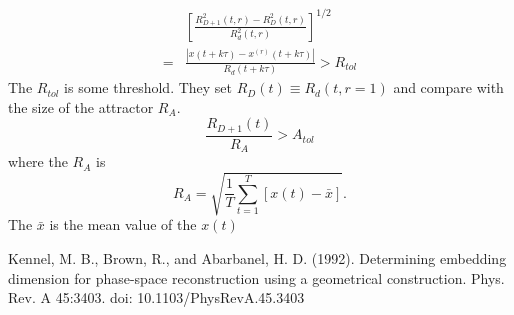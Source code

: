 \documentclass[conference]{IEEEtran}
\begin{document}
 \begin{equation}
     \begin{aligned}
      &\left[\frac{R_{D+1}^2(t,r) -R_{D}^2(t,r)}{R_d^2(t,r)}\right]^{1/2}\\
      =&\frac{\left|x(t+k\tau)-x^{(r)}(t+k\tau)\right|}{R_d(t+k\tau)}>R_{tol}
     \end{aligned}
 \end{equation}
 The $R_{tol}$ is some threshold. They set $R_D(t)\equiv R_d(t, r=1)$ and compare with the size of the attractor $R_A$.
 \begin{equation}
     \frac{R_{D+1}(t)}{R_A} > A_{tol}
 \end{equation}
 where the $R_A$ is 
 \begin{equation}
    R_A = \sqrt{\frac1T \sum_{t=1}^T\left[x(t) - \bar{x}\right]}.
 \end{equation}
 The $\bar{x}$ is the mean value of the $x(t)$
\begin{thebibliography}{99}
Kennel, M. B., Brown, R., and Abarbanel, H. D. (1992). Determining embedding dimension for phase-space reconstruction using a geometrical construction. Phys. Rev. A 45:3403. doi: 10.1103/PhysRevA.45.3403
\end{thebibliography}
\end{document}

